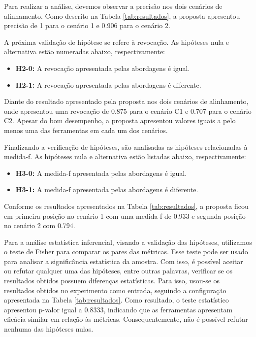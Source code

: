 Para realizar a análise, devemos observar a precisão nos dois cenários de alinhamento. Como descrito na Tabela \ref{tab:resultados}, a proposta apresentou precisão de 1 para o cenário 1 e 0.906 para o cenário 2.

A próxima validação de hipótese se refere à revocação. As hipóteses nula e alternativa estão numeradas abaixo, respectivamente:

\begin{itemize}
\item \textbf{H2-0:} A revocação apresentada pelas abordagens é igual.
\item \textbf{H2-1:} A revocação apresentada pelas abordagens é diferente.
\end{itemize}

Diante do resultado apresentado pela proposta nos dois cenários de alinhamento, onde apresentou uma revocação de 0.875 para o cenário C1 e 0.707 para o cenário C2. Apesar do bom desempenho, a proposta apresentou valores iguais a pelo menos uma das ferramentas em cada um dos cenários.

Finalizando a verificação de hipóteses, são analisadas as hipóteses relacionadas à medida-f. As hipóteses nula e alternativa estão listadas abaixo, respectivamente:

\begin{itemize}
\item \textbf{H3-0:} A medida-f apresentada pelas abordagens é igual.
\item \textbf{H3-1:} A medida-f apresentada pelas abordagens é diferente.
\end{itemize}

Conforme os resultados apresentados na Tabela \ref{tab:resultados}, a proposta ficou em primeira posição no cenário 1 com uma medida-f de 0.933 e segunda posição no cenário 2 com 0.794.

Para a análise estatística inferencial, visando a validação das hipóteses, utilizamos o teste de Fisher \cite{fisher1922mathematical} para comparar os pares das métricas. Esse teste pode ser usado para analisar a significância estatística da amostra. Com isso, é possível aceitar ou refutar qualquer uma das hipóteses, entre outras palavras, verificar se os resultados obtidos possuem diferenças estatísticas. Para isso, usou-se os resultados obtidos no experimento como entrada, seguindo a configuração apresentada na Tabela \ref{tab:resultados}. Como resultado, o teste estatístico apresentou p-valor igual a 0.8333, indicando que as ferramentas apresentam eficácia similar em relação às métricas. Consequentemente, não é possível refutar nenhuma das hipóteses nulas.

